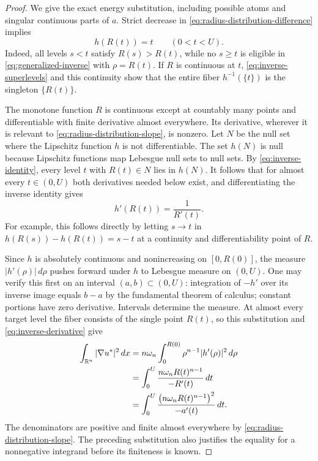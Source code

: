 \documentclass[11pt]{article}
\numberwithin{equation}{section}
\theoremstyle{definition}
\theoremstyle{remark}
\begin{document}
\begin{proof}
We give the exact energy substitution, including possible atoms and
singular continuous parts of $a$.  Strict decrease in
\eqref{eq:radius-distribution-difference} implies
\begin{equation}
 h(R(t))=t\qquad(0<t<U).
 \label{eq:inverse-identity}
\end{equation}
Indeed, all levels $s<t$ satisfy $R(s)>R(t)$, while no $s\ge t$ is
eligible in \eqref{eq:generalized-inverse} with $\rho=R(t)$.
If $R$ is continuous at $t$, \eqref{eq:inverse-superlevels} and this
continuity show that the entire fiber $h^{-1}(\{t\})$ is the singleton
$\{R(t)\}$.

The monotone function $R$ is continuous except at countably many
points and differentiable with finite derivative almost everywhere.
Its derivative, wherever it is relevant to
\eqref{eq:radius-distribution-slope}, is nonzero.
Let $N$ be the null set where the Lipschitz function $h$ is not
differentiable.  The set $h(N)$ is null because Lipschitz functions
map Lebesgue null sets to null sets.  By \eqref{eq:inverse-identity},
every level $t$ with $R(t)\in N$ lies in $h(N)$.  It follows that for
almost every $t\in(0,U)$ both derivatives needed below exist, and
differentiating the inverse identity gives
\begin{equation}
 h'(R(t))=\frac1{R'(t)}.
 \label{eq:inverse-derivative}
\end{equation}
For example, this follows directly by letting $s\to t$ in
$h(R(s))-h(R(t))=s-t$ at a continuity and differentiability point
of $R$.

Since $h$ is absolutely continuous and nonincreasing on $[0,R(0)]$,
the measure $|h'(\rho)|\,d\rho$ pushes forward under $h$ to Lebesgue
measure on $(0,U)$.  One may verify this first on an interval
$(a,b)\subset(0,U)$: integration of $-h'$ over its inverse image
equals $b-a$ by the fundamental theorem of calculus; constant
portions have zero derivative.  Intervals determine the measure.
At almost every target level the fiber consists of the single point
$R(t)$, so this substitution and \eqref{eq:inverse-derivative} give
\begin{align}
 \int_{\mathbb R^n}|\nabla u^*|^2\,d x
 &=n\omega_n\int_0^{R(0)}\rho^{n-1}|h'(\rho)|^2\,d\rho \notag\\
 &=\int_0^U\frac{n\omega_n R(t)^{n-1}}{-R'(t)}\,d t \notag\\
 &=\int_0^U
       \frac{\bigl(n\omega_n R(t)^{n-1}\bigr)^2}{-a'(t)}\,d t.
 \label{eq:rearranged-energy-identity}
\end{align}
The denominators are positive and finite almost everywhere by
\eqref{eq:radius-distribution-slope}.  The preceding substitution
also justifies the equality for a nonnegative integrand before its
finiteness is known.


\end{proof}
\end{document}
